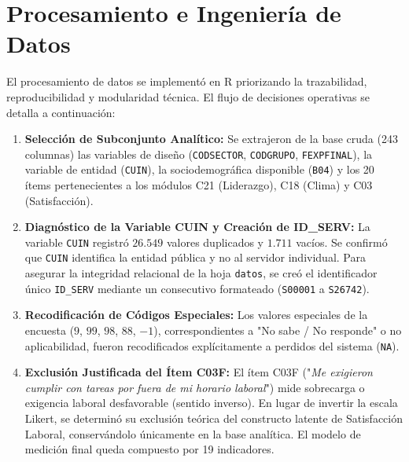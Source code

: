 \documentclass[11pt, a4paper]{article} %
\begin{document}
\section{Procesamiento e Ingeniería de Datos}

El procesamiento de datos se implementó en R priorizando la trazabilidad, reproducibilidad y modularidad técnica. El flujo de decisiones operativas se detalla a continuación:

\begin{enumerate}[leftmargin=*, itemsep=2pt]
    \item \textbf{Selección de Subconjunto Analítico:} Se extrajeron de la base cruda (243 columnas) las variables de diseño (\texttt{CODSECTOR}, \texttt{CODGRUPO}, \texttt{FEXPFINAL}), la variable de entidad (\texttt{CUIN}), la sociodemográfica disponible (\texttt{B04}) y los 20 ítems pertenecientes a los módulos C21 (Liderazgo), C18 (Clima) y C03 (Satisfacción).
    \item \textbf{Diagnóstico de la Variable CUIN y Creación de ID\_SERV:} La variable \texttt{CUIN} registró $26.549$ valores duplicados y $1.711$ vacíos. Se confirmó que \texttt{CUIN} identifica la entidad pública y no al servidor individual. Para asegurar la integridad relacional de la hoja \texttt{datos}, se creó el identificador único \texttt{ID\_SERV} mediante un consecutivo formateado (\texttt{S00001} a \texttt{S26742}).
    \item \textbf{Recodificación de Códigos Especiales:} Los valores especiales de la encuesta ($9$, $99$, $98$, $88$, $-1$), correspondientes a "No sabe / No responde" o no aplicabilidad, fueron recodificados explícitamente a perdidos del sistema (\texttt{NA}).
    \item \textbf{Exclusión Justificada del Ítem C03F:} El ítem C03F ("\textit{Me exigieron cumplir con tareas por fuera de mi horario laboral}") mide sobrecarga o exigencia laboral desfavorable (sentido inverso). En lugar de invertir la escala Likert, se determinó su exclusión teórica del constructo latente de Satisfacción Laboral, conservándolo únicamente en la base analítica. El modelo de medición final queda compuesto por 19 indicadores.
\end{enumerate}
\end{document}
